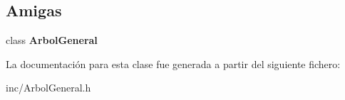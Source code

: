 \subsection*{Amigas}
\begin{DoxyCompactItemize}
\item 
class {\bfseries Arbol\+General}\hypertarget{class_arbol_general_1_1iter__preorden_a9c06e31b7c3e0d4ee5b03003d32935a5}{}\label{class_arbol_general_1_1iter__preorden_a9c06e31b7c3e0d4ee5b03003d32935a5}

\end{DoxyCompactItemize}


La documentación para esta clase fue generada a partir del siguiente fichero\+:\begin{DoxyCompactItemize}
\item 
inc/Arbol\+General.\+h\end{DoxyCompactItemize}
